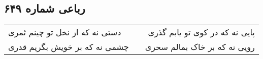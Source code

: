 \begin{center}
\section*{رباعی شماره ۶۴۹}
\label{sec:sh649}
\begin{longtable}{l p{0.5cm} r}
دستی نه که از نخل تو چینم ثمری
&&
پایی نه که در کوی تو یابم گذری
\\
چشمی نه که بر خویش بگریم قدری
&&
رویی نه که بر خاک بمالم سحری
\\
\end{longtable}
\end{center}

